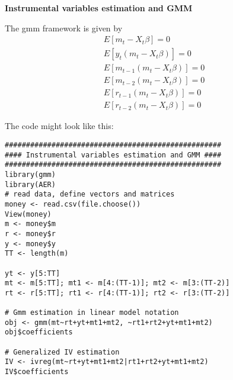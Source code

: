 \begin{Solution}{14.5}
\textbf{Instrumental variables estimation and GMM }

The gmm framework is given by
\begin{align*}
  E[m_t -X_t\beta] = 0\\
  E[y_t(m_t -X_t\beta)] = 0\\
  E[m_{t-1}(m_t -X_t\beta)] = 0\\
  E[m_{t-2}(m_t -X_t\beta)] = 0\\
  E[r_{t-1}(m_t -X_t\beta)] = 0\\
  E[r_{t-2}(m_t -X_t\beta)] = 0
\end{align*}

 The code might look like this:
\begin{verbatim}
###################################################
#### Instrumental variables estimation and GMM ####
###################################################
library(gmm)
library(AER)
# read data, define vectors and matrices
money <- read.csv(file.choose())
View(money)
m <- money$m
r <- money$r
y <- money$y
TT <- length(m)

yt <- y[5:TT]
mt <- m[5:TT]; mt1 <- m[4:(TT-1)]; mt2 <- m[3:(TT-2)]
rt <- r[5:TT]; rt1 <- r[4:(TT-1)]; rt2 <- r[3:(TT-2)]

# Gmm estimation in linear model notation
obj <- gmm(mt~rt+yt+mt1+mt2, ~rt1+rt2+yt+mt1+mt2)
obj$coefficients

# Generalized IV estimation
IV <- ivreg(mt~rt+yt+mt1+mt2|rt1+rt2+yt+mt1+mt2)
IV$coefficients
\end{verbatim}
\end{Solution}
